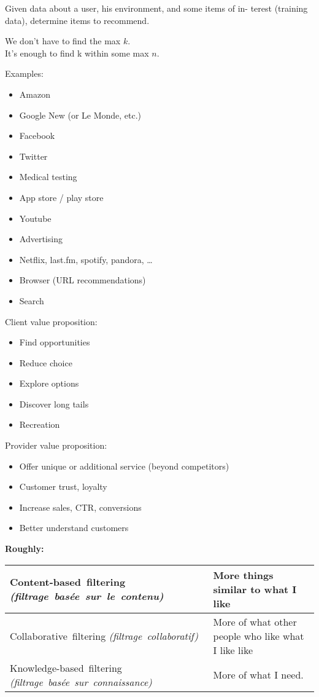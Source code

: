 




Given data about a user, his environment, and some items of in-
terest (training data), determine items to recommend.

We don’t have to find the max $k$.\\
It’s enough to find k within some max $n$.

Examples:
\begin{itemize}
\item Amazon
\item Google New (or Le Monde, etc.)
\item Facebook
\item Twitter
\item Medical testing
\item App store / play store
\item Youtube
\item Advertising
\item Netflix, last.fm, spotify, pandora, \dots
\item Browser (URL recommendations)
\item Search
\end{itemize}

Client value proposition:
\begin{itemize}
\item Find opportunities
\item Reduce choice
\item Explore options
\item Discover long tails
\item Recreation
\end{itemize}

Provider value proposition:
\begin{itemize}
\item Offer unique or additional service (beyond competitors)
\item Customer trust, loyalty
\item Increase sales, CTR, conversions
\item Better understand customers
\end{itemize}

\textbf{Roughly:}

\begin{tabular}{|p{5.7cm}|p{4cm}|}
  \hline
  \topstrut\hbox{Content-based filtering}
  \hbox{\it (filtrage basée sur le contenu)}
  &
    More things similar to what I like\bottomstrut
  \\
  \hline
  \topstrut\hbox{Collaborative filtering}
  \hbox{\it (filtrage collaboratif)}
  &
    More of what other people who like what I like like
    \bottomstrut
  \\
  \hline
  \topstrut\hbox{Knowledge-based filtering}
  \hbox{\it (filtrage basée sur connaissance)}\bottomstrut
  &
    More of what I need.\bottomstrut
  \\
  \hline
\end{tabular}

